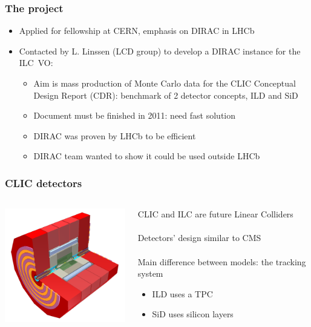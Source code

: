 \documentclass{beamer}
\begin{document}
\begin{frame}
\frametitle{The project}
\begin{itemize}
  \item Applied for \alert{fellowship at CERN}, emphasis on {\color{blue}DIRAC
  in LHCb}
  \item Contacted by L. Linssen ({\color{blue}LCD group}) to develop a
  \alert{DIRAC instance for the ILC~VO}:\\ 
  \begin{itemize}  
    \item Aim is \alert{mass production of Monte Carlo data} for the CLIC
    Conceptual Design Report (CDR): {\color{blue}benchmark of 2 detector
    concepts}, ILD and SiD
    \item Document must be {\color{blue} finished in 2011}: need fast solution
    \item DIRAC was proven by LHCb to be efficient
    \item DIRAC team wanted to show it could be used outside LHCb
  \end{itemize}
\end{itemize}
\end{frame}

\begin{frame}
\frametitle{CLIC detectors}
\begin{columns}
\begin{column}{6cm}
\includegraphics[width=6cm]{Detectors.png}
\end{column}
\begin{column}{5cm}
CLIC and ILC are future Linear Colliders\\
~\\
Detectors' design similar to CMS\\
~\\
Main difference between models: {\color{blue}the tracking system}
\begin{itemize}
  \item ILD uses a TPC
  \item SiD uses silicon layers
\end{itemize}
\end{column}
\end{columns}
\end{frame}
\end{document}
